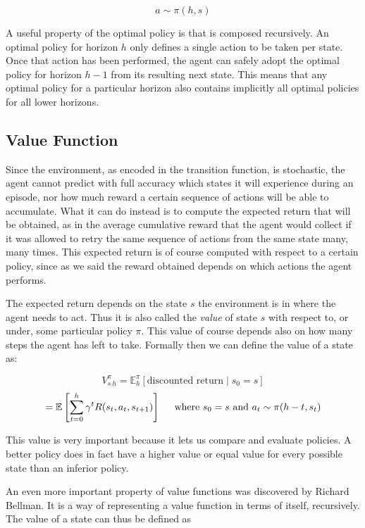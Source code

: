 \[ a \sim \pi(h, s) \]

A useful property of the optimal policy is that is composed recursively. An optimal policy for
horizon $h$ only defines a single action to be taken per state. Once that action has been performed,
the agent can safely adopt the optimal policy for horizon $h-1$ from its resulting next state. This
means that any optimal policy for a particular horizon also contains implicitly all optimal policies
for all lower horizons.

\subsection{Value Function}

Since the environment, as encoded in the transition function, is stochastic, the agent cannot
predict with full accuracy which states it will experience during an episode, nor how much reward a
certain sequence of actions will be able to accumulate. What it can do instead is to compute the
expected return that will be obtained, as in the average cumulative reward that the agent would
collect if it was allowed to retry the same sequence of actions from the same state many, many
times. This expected return is of course computed with respect to a certain policy, since as we said
the reward obtained depends on which actions the agent performs.

The expected return depends on the state $s$ the environment is in where the agent needs to act.
Thus it is also called the \textit{value} of state $s$ with respect to, or under, some particular
policy $\pi$. This value of course depends also on how many steps the agent has left to take.
Formally then we can define the value of a state as:

\[ V^\pi_{s\:h} = \mathbb{E}^\pi_h \left [\text{discounted return} \mid s_0 = s \right ] \]
\[ = \mathbb{E} \left [\sum_{t=0}^{h} \gamma^t R(s_{t}, a_t, s_{t+1}) \right ]
    \hspace{0.5cm}\text{where }s_0 = s \text{ and }a_t \sim \pi(h-t, s_t) \]

This value is very important because it lets us compare and evaluate policies. A better policy does
in fact have a higher value or equal value for every possible state than an inferior policy.

An even more important property of value functions was discovered by Richard Bellman. It is a way of
representing a value function in terms of itself, recursively. The value of a state can thus be
defined as

